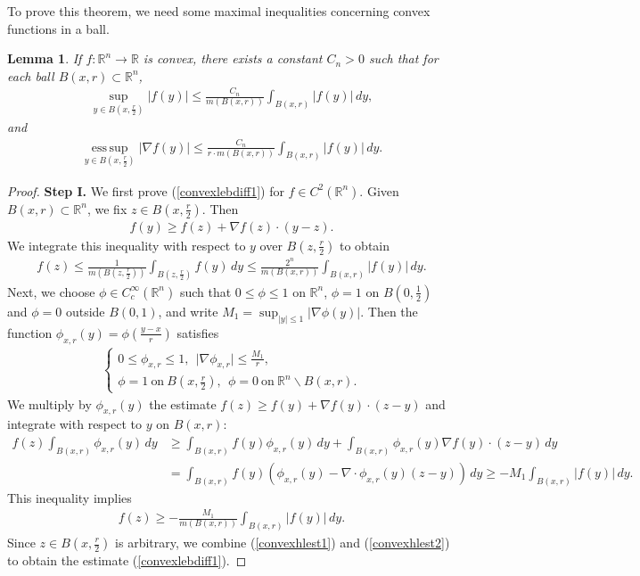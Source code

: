 \documentclass{article}
\numberwithin{equation}{section}
\newcommand{\bbR}{\mathbb{R}}
\DeclareMathOperator{\esssup}{ess\,sup}
\theoremstyle{plain}
\newtheorem{lemma}[theorem]{Lemma}
\theoremstyle{definition}
\begin{document}
To prove this theorem, we need some maximal inequalities concerning convex functions in a ball.
\begin{lemma}
If $f:\bbR^n\to\bbR$ is convex, there exists a constant $C_n>0$ such that for each ball $B(x,r)\subset\bbR^n$,
	\begin{align}
		\sup_{y\in B(x,\frac{r}{2})}\vert f(y)\vert\leq\frac{C_n}{m(B(x,r))}\int_{B(x,r)}\vert f(y)\vert\,dy,\label{convexlebdiff1}
	\end{align}
	and 
	\begin{align}
		\underset{y\in B(x,\frac{r}{2})}{\esssup}\vert \nabla f(y)\vert\leq\frac{C_n}{r\cdot m(B(x,r))}\int_{B(x,r)}\vert f(y)\vert\,dy.\label{convexlebdiff2}
	\end{align}
\end{lemma}
\begin{proof}
\textbf{Step I.} We first prove (\ref{convexlebdiff1}) for $f\in C^2(\bbR^n)$. Given $B(x,r)\subset\bbR^n$, we fix $z\in B(x,\frac{r}{2})$. Then
\begin{align*}
	f(y)\geq f(z)+\nabla f(z)\cdot (y-z).
\end{align*}
We integrate this inequality with respect to $y$ over $B(z,\frac{r}{2})$ to obtain
\begin{align}
f(z)\leq\frac{1}{m(B(z,\frac{r}{2}))}\int_{B(z,\frac{r}{2})}f(y)\,dy\leq\frac{2^n}{m(B(x,r))}\int_{B(x,r)}\vert f(y)\vert\,dy.\label{convexhlest1}
\end{align}
Next, we choose $\phi\in C_c^\infty(\bbR^n)$ such that $0\leq\phi\leq 1$ on $\bbR^n$, $\phi=1$ on $B(0,\frac{1}{2})$ and $\phi=0$ outside $B(0,1)$, and write $M_1=\sup_{\vert y\vert\leq1}\vert\nabla\phi(y)\vert$. Then the function $\phi_{x,r}(y)=\phi(\frac{y-x}{r})$ satisfies
\begin{align*}
\begin{cases}
0\leq\phi_{x,r}\leq 1,\ \ \vert\nabla\phi_{x,r}\vert\leq\frac{M_1}{r},\\
\phi=1\ \text{on}\ B(x,\frac{r}{2}),\ \ \phi=0\ \text{on}\ \bbR^n\backslash B(x,r).
\end{cases}
\end{align*}
We multiply by $\phi_{x,r}(y)$ the estimate $f(z)\geq f(y)+\nabla f(y)\cdot (z-y)$ and integrate with respect to $y$ on $B(x,r)$:
\begin{align*}
	f(z)\int_{B(x,r)}\phi_{x,r}(y)\,dy&\geq \int_{B(x,r)}f(y)\phi_{x,r}(y)\,dy+\int_{B(x,r)}\phi_{x,r}(y)\nabla f(y)\cdot(z-y)\,dy\\
	&=\int_{B(x,r)}f(y)\left(\phi_{x,r}(y)-\nabla\cdot\phi_{x,r}(y)(z-y)\right)\,dy\geq -M_1\int_{B(x,r)}\vert f(y)\vert\,dy.
\end{align*}
This inequality implies
\begin{align}
	f(z)\geq -\frac{M_1}{m(B(x,r))}\int_{B(x,r)}\vert f(y)\vert\,dy.\label{convexhlest2}
\end{align}
Since $z\in B(x,\frac{r}{2})$ is arbitrary, we combine (\ref{convexhlest1}) and (\ref{convexhlest2}) to obtain the estimate (\ref{convexlebdiff1}).


\end{proof}
\end{document}
